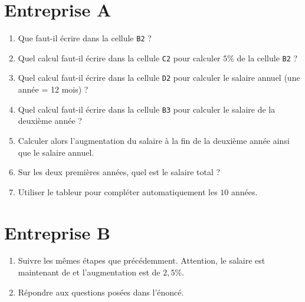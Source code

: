 \documentclass[12pt,french]{article}
\begin{document}
\section*{Entreprise A}
\begin{enumerate}
    \item Que faut-il écrire dans la cellule \texttt{B2} ?
    \item Quel calcul faut-il écrire dans la cellule \texttt{C2} pour calculer $5\%$ de la cellule \texttt{B2} ?
    \item Quel calcul faut-il écrire dans la cellule \texttt{D2} pour calculer le salaire annuel (une année = 12 mois) ?
    \item Quel calcul faut-il écrire dans la cellule \texttt{B3} pour calculer le salaire de la deuxième année ?
    \item Calculer alors l'augmentation du salaire à la fin de la deuxième année ainsi que le salaire annuel.
    \item Sur les deux premières années, quel est le salaire total ?
    \item Utiliser le tableur pour compléter automatiquement les $10$ années.
\end{enumerate}

\section*{Entreprise B}
\begin{enumerate}
    \item Suivre les mêmes étapes que précédemment. Attention, le salaire est maintenant de  et l'augmentation est de $2,5\%$.
    \item Répondre aux questions posées dans l'énoncé.
\end{enumerate}
\end{document}
